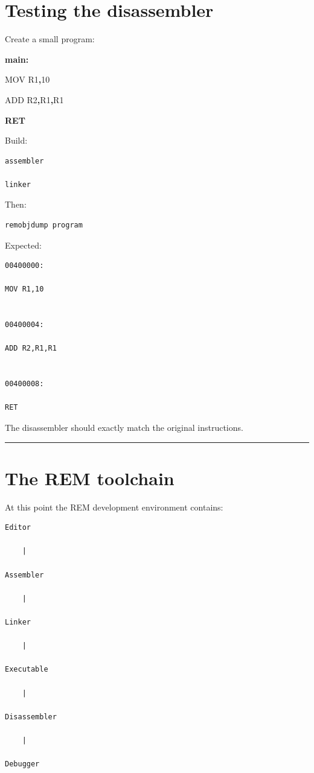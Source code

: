 \documentclass[
  oneside,
  openany]{book}
\newenvironment{Shaded}{\begin{snugshade}}{\end{snugshade}}
\newcommand{\BuiltInTok}[1]{#1}
\newcommand{\ControlFlowTok}[1]{\textcolor[rgb]{0.13,0.29,0.53}{\textbf{#1}}}
\newcommand{\DecValTok}[1]{\textcolor[rgb]{0.00,0.00,0.81}{#1}}
\newcommand{\FunctionTok}[1]{\textcolor[rgb]{0.13,0.29,0.53}{\textbf{#1}}}
\newcommand{\NormalTok}[1]{#1}
\newcommand{\OperatorTok}[1]{\textcolor[rgb]{0.81,0.36,0.00}{\textbf{#1}}}
\begin{document}
\hypertarget{testing-the-disassembler}{%
\section{Testing the disassembler}\label{testing-the-disassembler}}

Create a small program:

\begin{Shaded}
\begin{Highlighting}[]
\FunctionTok{main:}

    \BuiltInTok{MOV}\NormalTok{ R1}\OperatorTok{,}\DecValTok{10}

    \BuiltInTok{ADD}\NormalTok{ R2}\OperatorTok{,}\NormalTok{R1}\OperatorTok{,}\NormalTok{R1}

    \ControlFlowTok{RET}
\end{Highlighting}
\end{Shaded}

Build:

\begin{verbatim}
assembler

linker
\end{verbatim}

Then:

\begin{verbatim}
remobjdump program
\end{verbatim}

Expected:

\begin{verbatim}
00400000:

MOV R1,10


00400004:

ADD R2,R1,R1


00400008:

RET
\end{verbatim}

The disassembler should exactly match the original instructions.

\begin{center}\rule{0.5\linewidth}{0.5pt}\end{center}

\hypertarget{the-rem-toolchain}{%
\section{The REM toolchain}\label{the-rem-toolchain}}

At this point the REM development environment contains:

\begin{verbatim}
Editor

    |

Assembler

    |

Linker

    |

Executable

    |

Disassembler

    |

Debugger
\end{verbatim}
\end{document}
